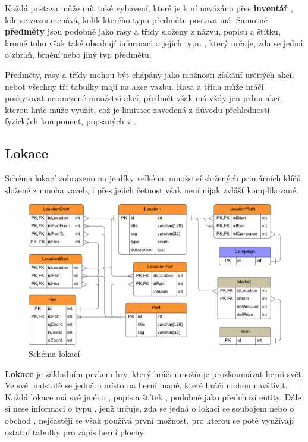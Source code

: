 Každá postava může mít také vybavení, které je k ní navázáno přes \textbf{inventář} , kde se zaznamenává, kolik kterého typu předmětu postava má. Samotné \textbf{předměty}  jsou podobně jako rasy a třídy složeny z názvu, popisu a štítku, kromě toho však také obsahují informaci o jejich typu , který určuje, zda se jedná o zbraň, brnění nebo jiný typ předmětu.

Předměty, rasy a třídy mohou být chápány jako možnosti získání určitých akcí, neboť všechny tři tabulky mají na akce vazbu. Rasa a třída může hráči poskytovat neomezené množství akcí, předmět však má vždy jen jednu akci, kterou hráč může využít, což je limitace zavedená z důvodu přehlednosti fyzických komponent, popsaných v .

\subsection{Lokace}
\label{subsec:schema_location}

Schéma lokací zobrazeno na  je díky velkému množství složených primárních klíčů složené z mnoha vazeb, i přes jejich četnost však není nijak zvlášť komplikované.

\begin{figure}[h]
    \centering
    \includegraphics{../../shared/diagrams/er_location.pdf}
    \caption{Schéma lokací}
    \label{diag:er_location}
\end{figure}

\textbf{Lokace}  je základním prvkem hry, který hráči umožňuje prozkoumávat herní svět. Ve své podstatě se jedná o místo na herní mapě, které hráči mohou navštívit. Každá lokace má své jméno , popis  a štítek , podobně jako předchozí entity. Dále si nese informaci o typu , jenž určuje, zda se jedná o lokaci se soubojem  nebo o obchod , nejčastěji se však používá první možnost, pro kterou se poté využívají ostatní tabulky pro zápis herní plochy.

